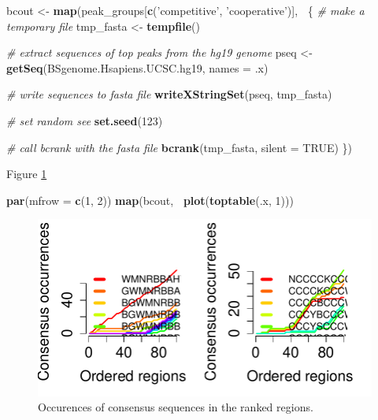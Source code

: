 \documentclass[9pt,a4paper,]{extarticle}
\newenvironment{Shaded}{\begin{snugshade}}{\end{snugshade}}
\newcommand{\CommentTok}[1]{\textcolor[rgb]{0.56,0.35,0.01}{\textit{#1}}}
\newcommand{\DataTypeTok}[1]{\textcolor[rgb]{0.13,0.29,0.53}{#1}}
\newcommand{\DecValTok}[1]{\textcolor[rgb]{0.00,0.00,0.81}{#1}}
\newcommand{\KeywordTok}[1]{\textcolor[rgb]{0.13,0.29,0.53}{\textbf{#1}}}
\newcommand{\NormalTok}[1]{#1}
\newcommand{\OperatorTok}[1]{\textcolor[rgb]{0.81,0.36,0.00}{\textbf{#1}}}
\newcommand{\OtherTok}[1]{\textcolor[rgb]{0.56,0.35,0.01}{#1}}
\newcommand{\StringTok}[1]{\textcolor[rgb]{0.31,0.60,0.02}{#1}}
\begin{document}
\begin{Shaded}
\begin{Highlighting}[]
\NormalTok{bcout <-}\StringTok{ }\KeywordTok{map}\NormalTok{(peak_groups[}\KeywordTok{c}\NormalTok{(}\StringTok{'competitive'}\NormalTok{, }\StringTok{'cooperative'}\NormalTok{)],}
             \OperatorTok{~}\NormalTok{\{}
               \CommentTok{# make a temporary file}
\NormalTok{               tmp_fasta <-}\StringTok{ }\KeywordTok{tempfile}\NormalTok{()}
               
               \CommentTok{# extract sequences of top peaks from the hg19 genome}
\NormalTok{               pseq <-}\StringTok{ }\KeywordTok{getSeq}\NormalTok{(BSgenome.Hsapiens.UCSC.hg19,}
                              \DataTypeTok{names =}\NormalTok{ .x)}
               
               \CommentTok{# write sequences to fasta file}
               \KeywordTok{writeXStringSet}\NormalTok{(pseq, tmp_fasta)}
               
               \CommentTok{# set random see}
               \KeywordTok{set.seed}\NormalTok{(}\DecValTok{123}\NormalTok{)}
                
               \CommentTok{# call bcrank with the fasta file}
               \KeywordTok{bcrank}\NormalTok{(tmp_fasta, }\DataTypeTok{silent =} \OtherTok{TRUE}\NormalTok{)}
\NormalTok{             \})}
\end{Highlighting}
\end{Shaded}

Figure \ref{fig:occurences}

\begin{Shaded}
\begin{Highlighting}[]
\KeywordTok{par}\NormalTok{(}\DataTypeTok{mfrow =} \KeywordTok{c}\NormalTok{(}\DecValTok{1}\NormalTok{, }\DecValTok{2}\NormalTok{))}
\KeywordTok{map}\NormalTok{(bcout, }\OperatorTok{~}\KeywordTok{plot}\NormalTok{(}\KeywordTok{toptable}\NormalTok{(.x, }\DecValTok{1}\NormalTok{)))}
\end{Highlighting}
\end{Shaded}

\begin{figure}

{\centering \includegraphics{targetFlow_files/figure-latex/occurences-1} 

}

\caption{Occurences of consensus sequences in the ranked regions.}\label{fig:occurences}
\end{figure}
\end{document}
